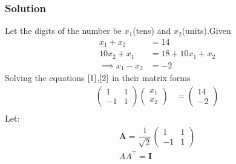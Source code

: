 \documentclass{beamer}
\begin{document}
\begin{frame}
\frametitle{Solution}
Let the digits of the number be $x_1$(tens) and $x_2$(units).Given
\begin{align}
    x_1+x_2 &= 14 \label{1}\\
    10x_2+x_1 &= 18 + 10x_1+x_2\\
    \implies x_1-x_2 &= -2\label{2}
\end{align}
Solving the equations $\eqref{1}$,$\eqref{2}$ in their matrix forms
\begin{align}
    \begin{pmatrix}
        1 & 1\\
        -1 & 1
    \end{pmatrix}
    \begin{pmatrix}
        x_1\\
        x_2
    \end{pmatrix} &= \begin{pmatrix}
        14\\
        -2
    \end{pmatrix}   \\
    \end{align}
    Let:
    \begin{align}
        \textbf{A}=\dfrac{1}{\sqrt{2}}\begin{pmatrix}
        1 & 1\\
        -1 & 1
    \end{pmatrix}\\
    AA^\top = \textbf{I}    
    \end{align}
\end{frame}
\end{document}
